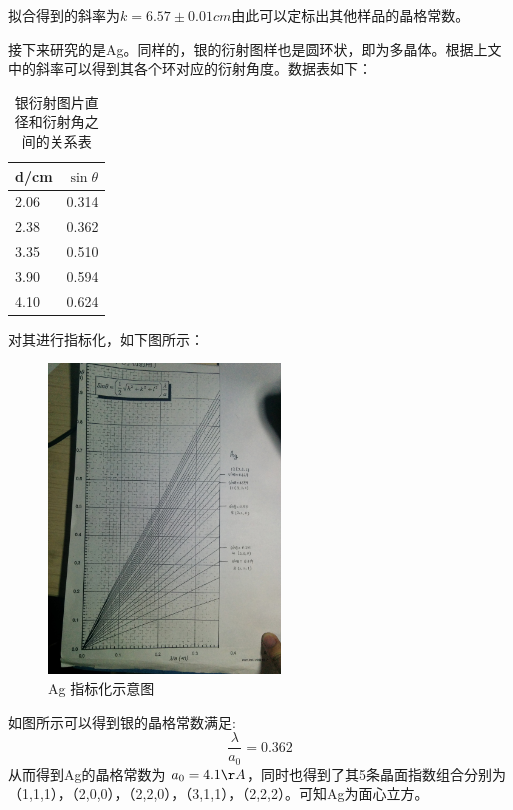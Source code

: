 \documentclass[aps,pre,12pt,preprint,onecolumn,showpacs,showkeys,UTF8]{revtex4-1}
\begin{document}
拟合得到的斜率为$k=6.57\pm0.01 cm$由此可以定标出其他样品的晶格常数。

接下来研究的是Ag。同样的，银的衍射图样也是圆环状，即为多晶体。根据上文中的斜率可以得到其各个环对应的衍射角度。数据表如下：

\begin{center}
	\begin{table}[h]
		\caption{银衍射图片直径和衍射角之间的关系表}
		\begin{tabularx}{10cm}{XX}
			\hline
			\hline
			d/cm&$\sin{\theta}$\\
			\hline
			2.06&0.314\\
			2.38&0.362\\
			3.35&0.510\\
			3.90&0.594\\
			4.10&0.624\\
			\hline
			\hline
		\end{tabularx}
	\end{table}
\end{center}
对其进行指标化，如下图所示：
\begin{figure}[h]
	\begin{center}
		\includegraphics[width=0.55\textwidth]{Ag.png}
		\caption{\label{fig:exp2}Ag 指标化示意图}
	\end{center}
\end{figure}

如图所示可以得到银的晶格常数满足:
\begin{equation}
	\frac{\lambda}{a_0}=0.362
\end{equation}
从而得到Ag的晶格常数为 $a_0=4.1\AA$，同时也得到了其5条晶面指数组合分别为（1,1,1），（2,0,0），（2,2,0），（3,1,1），（2,2,2）。可知Ag为面心立方。
\end{document}
